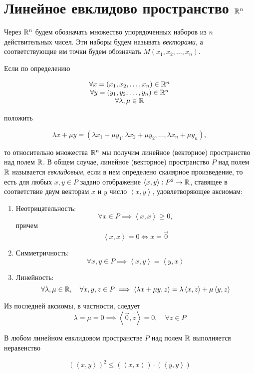 \documentclass[../../main.tex]{subfiles}
\begin{document}
\section{Линейное евклидово пространство $\mathbb{R}^n$}

Через $\mathbb{R}^n$ будем обозначать множество упорядоченных наборов из $n$
действительных чисел. Эти наборы будем называть \textit{векторами},
а соответствующие им точки будем обозначать $M(x_1, x_2, \dots, x_n)$.

Если по определению

\[
\begin{array}{c}
 \forall x = (x_1, x_2, \dots, x_n) \in \mathbb{R}^n \\
 \forall y = (y_1, y_2, \dots, y_n) \in \mathbb{R}^n \\
 \forall \lambda, \mu \in \mathbb{R}
\end{array}
\]

положить

\[\lambda x + \mu y = (\lambda x_1 + \mu y_1, \lambda x_2 + \mu y_2, 
\dots, \lambda x_n + \mu y_n),\]

то относительно множества $\mathbb{R}^n$ мы получим линейное (векторное) 
пространство над полем $\mathbb{R}$. В общем случае, линейное (векторное) 
пространство $P$ над полем $\mathbb{R}$ называется \textit{евклидовым},
если в нем определено скалярное произведение, то есть для любых 
$x, y \in P$ задано отображение $\left<x, y\right>: P^2 \to \mathbb{R}$, 
ставящее в соответствие двум векторам $x$ и $y$ число 
$\left<x, y\right>$, удовлетворяющее аксиомам:

\begin{enumerate}
 \item Неотрицательность:
 \[\forall x \in P \implies \left<x, x\right> \ge 0,\]
 причем
 \[\left<x, x\right> = 0 \iff x = \vec 0\]
 \item Симметричность:
 \[\forall x, y \in P \implies \left<x, y\right> = \left<y, x\right>\]
 \item Линейность:
 \[\forall \lambda, \mu \in \mathbb{R}, \quad \forall x, y, z \in P \implies
 \left<\lambda x + \mu y, z\right> = \lambda\left<x, z\right> + 
 \mu\left<y, z\right>\]
\end{enumerate}

Из последней аксиомы, в частности, следует \[ \lambda = \mu = 0
\implies \left<\vec{0}, z\right> = 0, \quad \forall z \in P\]

\begin{thm}
 В любом линейном евклидовом пространстве $P$ над полем $\mathbb{R}$
 выполняется неравенство
 
 \begin{equation}
  \label{kosh-bun}
  (\left<x, y\right>)^2 \leq \left(\left<x, x\right>\right) 
  \cdot \left(\left<y, y\right>\right)
 \end{equation}
\end{thm}
\end{document}
